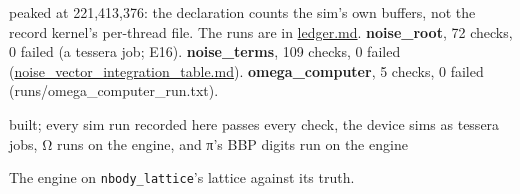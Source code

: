 \begin{description}
peaked at 221,413,376: the declaration counts the sim's own buffers, not the record kernel's per-thread file. The runs are in \hyperref[chap:ledger]{ledger.md}. \textbf{noise\_\allowbreak{}root}, 72 checks, 0 failed (a tessera job; E16). \textbf{noise\_\allowbreak{}terms}, 109 checks, 0 failed (\hyperref[chap:noise-vector-integration-table]{noise\_\allowbreak{}vector\_\allowbreak{}integration\_\allowbreak{}table.md}). \textbf{omega\_\allowbreak{}computer}, 5 checks, 0 failed (runs/omega\_\allowbreak{}computer\_\allowbreak{}run.txt).
\item[{status}] built; every sim run recorded here passes every check, the device sims as tessera jobs, Ω runs on the engine, and π's BBP digits run on the engine
\item[{next}] The engine on \texttt{nbody\_\allowbreak{}lattice}'s lattice against its truth.
\end{description}

